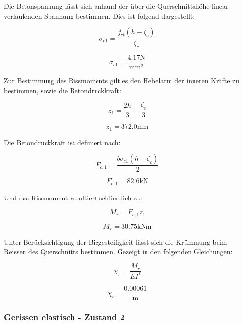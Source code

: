 \documentclass[
  12pt,
  letterpaper,
  egregdoesnotlikesansseriftitles]{scrreprt}
\begin{document}
Die Betonspannung lässt sich anhand der über die Querschnittshöhe linear
verlaufenden Spannung bestimmen. Dies ist folgend dargestellt:

\begin{equation}\sigma_{c 1} = \frac{f_{ct} \left(h - \zeta_{c}\right)}{\zeta_{c}}\end{equation}

\begin{equation}\sigma_{c 1} = \frac{4.17 \text{N}}{\text{mm}^{2}}\end{equation}

Zur Bestimmung des Rissmoments gilt es den Hebelarm der inneren Kräfte
zu bestimmen, sowie die Betondruckkraft:

\begin{equation}z_{1} = \frac{2 h}{3} + \frac{\zeta_{c}}{3}\end{equation}

\begin{equation}z_{1} = 372.0 \text{mm}\end{equation}

Die Betondruckkraft ist definiert nach:

\begin{equation}F_{c,1} = \frac{b \sigma_{c 1} \left(h - \zeta_{c}\right)}{2}\end{equation}

\begin{equation}F_{c,1} = 82.6 \text{kN}\end{equation}

Und das Rissmoment resultiert schliesslich zu:

\begin{equation}M_{r} = F_{c,1} z_{1}\end{equation}

\begin{equation}M_{r} = 30.75 \text{kN} \text{m}\end{equation}

Unter Berücksichtigung der Biegesteifigkeit lässt sich die Krümmung beim
Reissen des Querschnitts bestimmen. Gezeigt in den folgenden
Gleichungen:

\begin{equation}\chi_{r} = \frac{M_{r}}{EI^{I}}\end{equation}

\begin{equation}\chi_{r} = \frac{0.00061}{\text{m}}\end{equation}

\hypertarget{gerissen-elastisch---zustand-2-1}{%
\subsubsection{Gerissen elastisch - Zustand
2}\label{gerissen-elastisch---zustand-2-1}}
\end{document}

